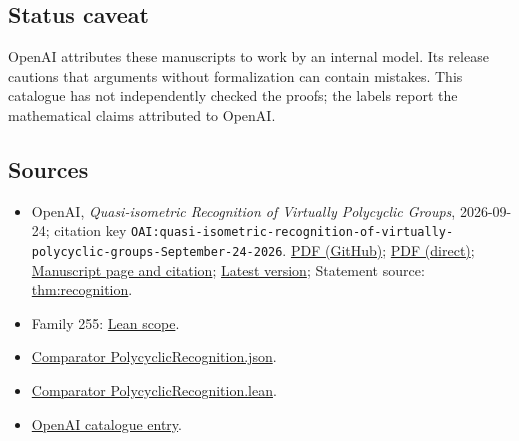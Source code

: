 \documentclass[11pt]{article}
\begin{document}
\subsection{Status caveat}
OpenAI attributes these manuscripts to work by an internal model. Its release cautions that arguments without formalization can contain mistakes. This catalogue has not independently checked the proofs; the labels report the mathematical claims attributed to OpenAI.

\subsection{Sources}
\begin{itemize}
\item OpenAI, \emph{Quasi-isometric Recognition of Virtually Polycyclic Groups}, 2026-09-24; citation key \texttt{OAI:quasi-isometric-recognition-of-virtually-polycyclic-groups-September-24-2026}. \href{https://github.com/openai/math/blob/adc7f1241b42e322a6451854ab7e4b4c146bf78a/preprints/quasi-isometric-recognition-of-virtually-polycyclic-groups-September-24-2026/paper.pdf}{PDF (GitHub)}; \href{https://github.com/openai/math/raw/adc7f1241b42e322a6451854ab7e4b4c146bf78a/preprints/quasi-isometric-recognition-of-virtually-polycyclic-groups-September-24-2026/paper.pdf}{PDF (direct)}; \href{https://github.com/openai/math/blob/adc7f1241b42e322a6451854ab7e4b4c146bf78a/preprints/quasi-isometric-recognition-of-virtually-polycyclic-groups-September-24-2026/README.md}{Manuscript page and citation}; \href{https://github.com/openai/math/blob/main/preprints/quasi-isometric-recognition-of-virtually-polycyclic-groups-September-24-2026/paper.pdf}{Latest version}; Statement source: \href{https://github.com/openai/math/blob/adc7f1241b42e322a6451854ab7e4b4c146bf78a/preprints/quasi-isometric-recognition-of-virtually-polycyclic-groups-September-24-2026/build/introduction.tex\#L10}{thm:recognition}.
\item Family 255: \href{https://github.com/openai/math/blob/adc7f1241b42e322a6451854ab7e4b4c146bf78a/lean/docs/255.md}{Lean scope}.
\item \href{https://github.com/openai/math/blob/adc7f1241b42e322a6451854ab7e4b4c146bf78a/lean/ComparatorChallenges/PolycyclicRecognition.json}{Comparator PolycyclicRecognition.json}.
\item \href{https://github.com/openai/math/blob/adc7f1241b42e322a6451854ab7e4b4c146bf78a/lean/ComparatorChallenges/PolycyclicRecognition.lean}{Comparator PolycyclicRecognition.lean}.
\item \href{https://github.com/openai/math/blob/adc7f1241b42e322a6451854ab7e4b4c146bf78a/CONTENTS.md}{OpenAI catalogue entry}.
\end{itemize}
\end{document}
